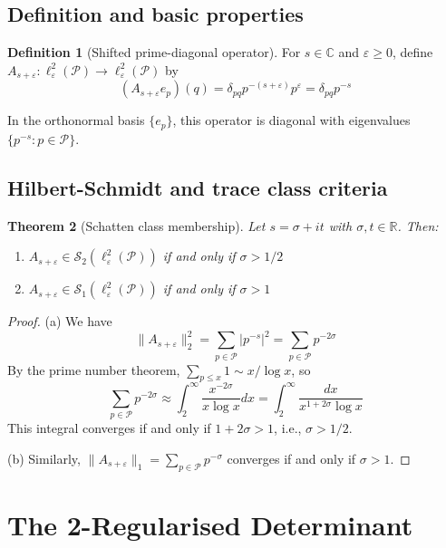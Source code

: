 \documentclass[11pt,a4paper]{article}
\newtheorem{theorem}{Theorem}[section]
\theoremstyle{definition}
\newtheorem{definition}[theorem]{Definition}
\theoremstyle{remark}
\newcommand{\C}{\mathbb{C}}
\newcommand{\R}{\mathbb{R}}
\newcommand{\calP}{\mathcal{P}}
\newcommand{\calS}{\mathcal{S}}
\begin{document}
\subsection{Definition and basic properties}

\begin{definition}[Shifted prime-diagonal operator]
For $s \in \C$ and $\varepsilon \geq 0$, define $A_{s+\varepsilon}: \ell^2_\varepsilon(\calP) \to \ell^2_\varepsilon(\calP)$ by
\[
(A_{s+\varepsilon} e_p)(q) = \delta_{pq} p^{-(s+\varepsilon)} p^\varepsilon = \delta_{pq} p^{-s}
\]
\end{definition}

In the orthonormal basis $\{e_p\}$, this operator is diagonal with eigenvalues $\{p^{-s} : p \in \calP\}$.

\subsection{Hilbert-Schmidt and trace class criteria}

\begin{theorem}[Schatten class membership]\label{thm:schatten}
Let $s = \sigma + it$ with $\sigma, t \in \R$. Then:
\begin{enumerate}
\item[(a)] $A_{s+\varepsilon} \in \calS_2(\ell^2_\varepsilon(\calP))$ if and only if $\sigma > 1/2$
\item[(b)] $A_{s+\varepsilon} \in \calS_1(\ell^2_\varepsilon(\calP))$ if and only if $\sigma > 1$
\end{enumerate}
\end{theorem}

\begin{proof}
(a) We have
\[
\|A_{s+\varepsilon}\|_2^2 = \sum_{p \in \calP} |p^{-s}|^2 = \sum_{p \in \calP} p^{-2\sigma}
\]
By the prime number theorem, $\sum_{p \leq x} 1 \sim x/\log x$, so
\[
\sum_{p \in \calP} p^{-2\sigma} \approx \int_2^\infty \frac{x^{-2\sigma}}{x \log x} dx = \int_2^\infty \frac{dx}{x^{1+2\sigma} \log x}
\]
This integral converges if and only if $1 + 2\sigma > 1$, i.e., $\sigma > 1/2$.

(b) Similarly, $\|A_{s+\varepsilon}\|_1 = \sum_{p \in \calP} p^{-\sigma}$ converges if and only if $\sigma > 1$.
\end{proof}

\section{The 2-Regularised Determinant}\label{sec:determinant}
\end{document}
